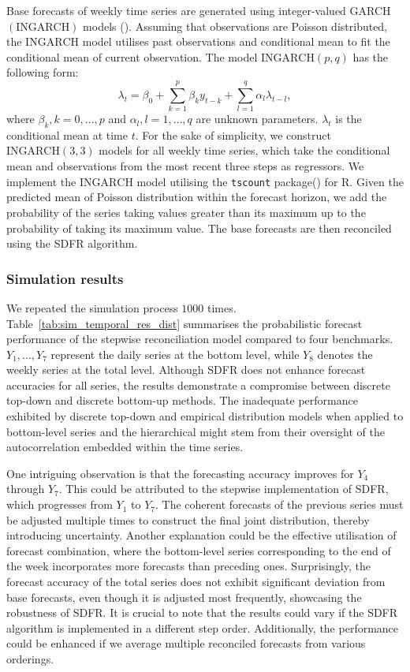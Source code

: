 \documentclass[a4paper,review,12pt,authoryear]{elsarticle}
\let\code=\texttt
\let\proglang=\textsf
\theoremstyle{definition}
\begin{document}
     Base forecasts of weekly time series are generated using integer-valued GARCH $(\textrm{INGARCH})$ models ().
     Assuming that observations are Poisson distributed, the $\textrm{INGARCH}$ model utilises past observations and conditional mean to fit the conditional mean of current observation. The model $\textrm{INGARCH}(p, q)$ has the following form:
     \[
      \lambda_t = \beta_0 + \sum_{k=1}^p \beta_ky_{t-k} + \sum_{l=1}^q \alpha_l\lambda_{t-l}, 
     \] where $\beta_k, k=0,\dots,p$ and $\alpha_l, l=1,\dots,q$ are unknown parameters. $\lambda_t$ is the conditional mean at time $t$.
     For the sake of simplicity, we construct $\textrm{INGARCH}(3, 3)$ models for all weekly time series, which take the conditional mean and observations from the most recent three steps as regressors.
     We implement the $\textrm{INGARCH}$ model utilising the \code{tscount} package() for \proglang{R}.
     Given the predicted mean of Poisson distribution within the forecast horizon, we add the probability of the series taking values greater than its maximum up to the probability of taking its maximum value.
     The base forecasts are then reconciled using the \textrm{SDFR} algorithm.


     \subsubsection{Simulation results}
     We repeated the simulation process $1000$ times.
     Table~\ref{tab:sim_temporal_res_dist} summarises the probabilistic forecast performance of the stepwise reconciliation model compared to four benchmarks.
     $Y_1,\dots,Y_7$ represent the daily series at the bottom level, while $Y_8$ denotes the weekly series at the total level.
     Although SDFR does not enhance forecast accuracies for all series, the results demonstrate a compromise between discrete top-down and discrete bottom-up methods.
     The inadequate performance exhibited by discrete top-down and empirical distribution models when applied to bottom-level series and the hierarchical might stem from their oversight of the autocorrelation embedded within the time series. 
     
     One intriguing observation is that the forecasting accuracy improves for $Y_4$ through $Y_7$.
     This could be attributed to the stepwise implementation of SDFR, which progresses from $Y_1$ to $Y_7$. The coherent forecasts of the previous series must be adjusted multiple times to construct the final joint distribution, thereby introducing uncertainty.
     Another explanation could be the effective utilisation of forecast combination, where the bottom-level series corresponding to the end of the week incorporates more forecasts than preceding ones.
     Surprisingly, the forecast accuracy of the total series does not exhibit significant deviation from base forecasts,  even though it is adjusted most frequently, showcasing the robustness of SDFR.
     It is crucial to note that the results could vary if the SDFR algorithm is implemented in a different step order.
     Additionally, the performance could be enhanced if we average multiple reconciled forecasts from various orderings.
\end{document}
